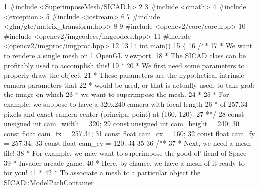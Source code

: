 \begin{DoxyCodeInclude}
1 \textcolor{preprocessor}{#include <\mbox{\hyperlink{SICAD_8h}{SuperimposeMesh/SICAD.h}}>}
2 
3 \textcolor{preprocessor}{#include <cmath>}
4 \textcolor{preprocessor}{#include <exception>}
5 \textcolor{preprocessor}{#include <iostream>}
6 
7 \textcolor{preprocessor}{#include <glm/gtc/matrix\_transform.hpp>}
8 
9 \textcolor{preprocessor}{#include <opencv2/core/core.hpp>}
10 \textcolor{preprocessor}{#include <opencv2/imgcodecs/imgcodecs.hpp>}
11 \textcolor{preprocessor}{#include <opencv2/imgproc/imgproc.hpp>}
12 
13 
14 \textcolor{keywordtype}{int} \mbox{\hyperlink{tutorial__superimpose_8cpp_ae66f6b31b5ad750f1fe042a706a4e3d4}{main}}()
15 \{\textcolor{comment}{}
16 \textcolor{comment}{    /**}
17 \textcolor{comment}{     * We want to rendere a single mesh on 1 OpenGL viewport.}
18 \textcolor{comment}{     * The SICAD class can be profitably used to accomplish this!}
19 \textcolor{comment}{     *}
20 \textcolor{comment}{     * We first need some parameters to properly draw the object.}
21 \textcolor{comment}{     * These parameters are the hypothetical intrinsic camera parameters that}
22 \textcolor{comment}{     * would be used, or that is actually used, to take grab the image on which}
23 \textcolor{comment}{     * we want to superimpose the mesh.}
24 \textcolor{comment}{     *}
25 \textcolor{comment}{     * For example, we suppose to have a 320x240 camera with focal length}
26 \textcolor{comment}{     * of 257.34 pixels and exact camera center (principal point) at (160, 120).}
27 \textcolor{comment}{     **/}
28     \textcolor{keyword}{const} \textcolor{keywordtype}{unsigned} \textcolor{keywordtype}{int} cam\_width  = 320;
29     \textcolor{keyword}{const} \textcolor{keywordtype}{unsigned} \textcolor{keywordtype}{int} cam\_height = 240;
30     \textcolor{keyword}{const} \textcolor{keywordtype}{float}        cam\_fx     = 257.34;
31     \textcolor{keyword}{const} \textcolor{keywordtype}{float}        cam\_cx     = 160;
32     \textcolor{keyword}{const} \textcolor{keywordtype}{float}        cam\_fy     = 257.34;
33     \textcolor{keyword}{const} \textcolor{keywordtype}{float}        cam\_cy     = 120;
34 
35 \textcolor{comment}{}
36 \textcolor{comment}{    /**}
37 \textcolor{comment}{     * Next, we need a mesh file!}
38 \textcolor{comment}{     * For example, we may want to superimpose the good ol' fiend of Space}
39 \textcolor{comment}{     * Invader arcade game.}
40 \textcolor{comment}{     * Here, by chance, we have a mesh of it ready to for you!}
41 \textcolor{comment}{     *}
42 \textcolor{comment}{     * To associate a mesh to a particular object the SICAD::ModelPathContainer}

\end{DoxyCodeInclude}
